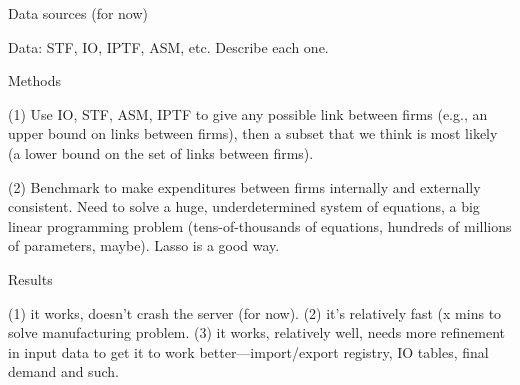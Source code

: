 \documentclass[12pt]{beamer}
\begin{document}
\begin{frame}{Data sources (for now)}

Data: STF, IO, IPTF, ASM, etc. Describe each one.

\end{frame}

\begin{frame}{Methods}

(1) Use IO, STF, ASM, IPTF to give any possible link between firms (e.g., an upper bound on links between firms), then a subset that we think is most likely (a lower bound on the set of links between firms).

(2) Benchmark to make expenditures between firms internally and externally consistent. Need to solve a huge, underdetermined system of equations, a big linear programming problem (tens-of-thousands of equations, hundreds of millions of parameters, maybe). Lasso is a good way.

\end{frame}

\begin{frame}{Results}

(1) it works, doesn't crash the server (for now).  (2) it's relatively fast (x mins to solve manufacturing problem. (3) it works, relatively well, needs more refinement in input data to get it to work better---import/export registry, IO tables, final demand and such.

\end{frame}

%
%
\end{document}

